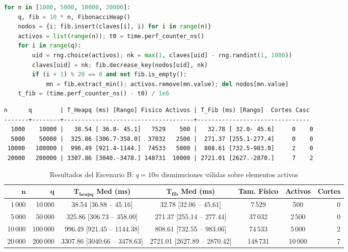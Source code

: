 \begin{lstlisting}[language=Python, caption={Código del benchmark para el Escenario B ($q = 10n$ disminuciones)}, label={lst:escenario_b_code}]
for n in [1000, 5000, 10000, 20000]:
    q, fib = 10 * n, FibonacciHeap()
    nodos = {i: fib.insert(claves[i], i) for i in range(n)}
    activos = list(range(n)); t0 = time.perf_counter_ns()
    for i in range(q):
        uid = rng.choice(activos); nk = max(1, claves[uid] - rng.randint(1, 1000))
        claves[uid] = nk; fib.decrease_key(nodos[uid], nk)
        if (i + 1) % 20 == 0 and not fib.is_empty():
            mn = fib.extract_min(); activos.remove(mn.value); del nodos[mn.value]
    t_fib = (time.perf_counter_ns() - t0) / 1e6
\end{lstlisting}

\begin{lstlisting}[style=consolestyle, caption={Salida de consola del Escenario B (5 repeticiones, tiempos en ms)}]
n      q        | T_Heapq (ms) [Rango] Fisico Activos | T_Fib (ms) [Rango]  Cortes Casc
-------+--------+-------------------------------------+--------------------------------
  1000    10000 |   38.54 [ 36.8- 45.1]   7529    500 |   32.78 [ 32.0- 45.6]     0    0
  5000    50000 |  325.86 [306.7-358.0]  37032   2500 |  271.37 [255.1-277.4]     0    0
 10000   100000 |  996.49 [921.4-1144.]  74533   5000 |  808.61 [732.5-983.0]     2    0
 20000   200000 | 3307.86 [3040.-3478.] 148731  10000 | 2721.01 [2627.-2870.]     7    2
\end{lstlisting}

\begin{table}[H]
    \caption{Resultados del Escenario B: $q = 10n$ disminuciones válidas sobre elementos activos}
    \label{tab:escenario_b}
    \centering
    \scriptsize
    \setlength{\tabcolsep}{3.5pt}
    \begin{tabular*}{\textwidth}{@{\extracolsep{\fill}}rrccccr}
        \toprule
        $\mathbf{n}$ & $\mathbf{q}$ & $\mathbf{T_{\text{heapq}}}$ \textbf{Med (ms)} & $\mathbf{T_{\text{fib}}}$ \textbf{Med (ms)} & \textbf{Tam. Físico} & \textbf{Activos} & \textbf{Cortes} \\
        \midrule
        1\,000  & 10\,000  & 38.54 [36.88 -- 45.16]  & 32.78 [32.06 -- 45.61]  & 7\,529   & 500   & 0 \\
        5\,000  & 50\,000  & 325.86 [306.73 -- 358.00] & 271.37 [255.14 -- 277.44] & 37\,032  & 2\,500 & 0 \\
        10\,000 & 100\,000 & 996.49 [921.45 -- 1144.38] & 808.61 [732.55 -- 983.06] & 74\,533  & 5\,000 & 2 \\
        20\,000 & 200\,000 & 3307.86 [3040.66 -- 3478.63] & 2721.01 [2627.89 -- 2870.42] & 148\,731 & 10\,000 & 7 \\
        \bottomrule
    \end{tabular*}
\end{table}

